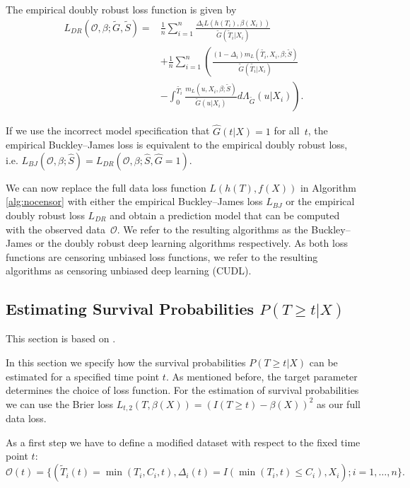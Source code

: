 \documentclass[12pt, a4paper]{scrartcl}
\theoremstyle{definition}
\theoremstyle{plain}
\numberwithin{equation}{section}
\numberwithin{figure}{section}
\numberwithin{table}{section}
\begin{document}
	The empirical doubly robust loss function is given by
	\begin{equation*}
	\begin{split}
	L_{DR}(\mathcal{O}, \beta; \tilde{G}, \tilde{S}) ={} & \frac{1}{n} \sum_{i=1}^n \frac{\Delta_i L(h(T_i),\beta(X_i))}{\tilde{G}(\tilde{T}_i\vert X_i)}\\
	~ & + \frac{1}{n} \sum_{i=1}^n \left(\frac{(1-\Delta_i)m_L(\tilde{T_i}, X_i, \beta; \tilde{S})}{\tilde{G}(\tilde{T_i}\vert X_i)} \right.\\
	& - \left. \int _0^{\tilde{T_i}} \frac{m_L(u, X_i, \beta; \tilde{S})}{\tilde{G}(u \vert X_i)} d \Lambda_{\tilde{G}}(u \vert X_i) \right).
	\end{split}
	\end{equation*}
	
	If we use the incorrect model specification that $\hat{G}(t\vert X)=1$ for all~$t$, the empirical  Buckley--James loss is equivalent to the empirical doubly robust loss, i.e. $L_{BJ}(\mathcal{O}, \beta; \hat{S})=L_{DR}(\mathcal{O}, \beta; \hat{S}, \hat{G} = 1)$.
		
	We can now replace the full data loss function $L(h(T), f(X))$ in Algorithm \ref{alg:nocensor} with either the empirical Buckley--James loss $L_{BJ}$ or the empirical doubly robust loss $L_{DR}$ and obtain a prediction model that can be computed with the observed data~$\mathcal{O}$.
	We refer to the resulting algorithms as the Buckley--James or the doubly robust deep learning algorithms respectively.
	As both loss functions are censoring unbiased loss functions, we refer to the resulting algorithms as censoring unbiased deep learning (CUDL). 
	
	\subsection{Estimating Survival Probabilities $P(T\geq t \vert X)$}
	
	This section is based on \citet*{basearticle}.
	
	In this section we specify how the survival probabilities $P(T\geq t \vert X)$ can be estimated for a specified time point $t$.
	As mentioned before, the target parameter determines the choice of loss function.
	For the estimation of survival probabilities we can use the Brier loss $L_{t,2}(T, \beta(X)) = (I(T \geq t) - \beta(X))^2$ as our full data loss.
	
	As a first step we have to define a modified dataset with respect to the fixed time point $t$:
	\begin{equation*}
		\mathcal{O}(t) = \{(\tilde{T}_i(t)=\min(T_i, C_i, t), \Delta_i(t) = I(\min(T_i, t) \leq C_i), X_i); i = 1,\dots,n\}.
	\end{equation*}
	
\end{document}
